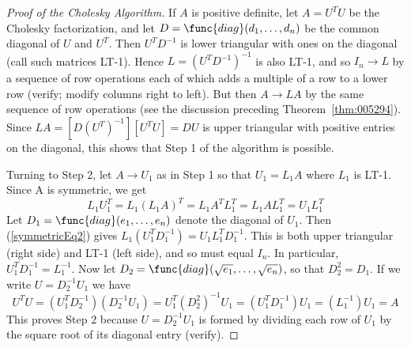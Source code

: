 \begin{proof}[Proof of the Cholesky Algorithm]
If $A$ is positive definite, let $A = U^{T}U$ be the Cholesky factorization, and let $D = \func{diag}(d_{1}, \dots, d_{n})$ be the common diagonal of $U$ and $U^{T}$. Then $U^{T}D^{-1}$ is lower triangular with ones on the diagonal (call such matrices LT-1). Hence $L = (U^{T}D^{-1})^{-1}$ is also LT-1, and so $I_{n} \to L$ by a sequence of row operations each of which adds a multiple of a row 
to a lower row (verify; modify columns right to left). But then $A \to LA$ by the same sequence of row operations (see the discussion preceding Theorem~\ref{thm:005294}). Since $LA = [D(U^{T})^{-1}][U^{T}U] = DU$ is upper triangular with positive entries on the diagonal, this shows that Step 1 of the algorithm is possible.

Turning to Step 2, let $A \to U_{1}$ as in Step 1 so that $U_{1} = L_{1}A$ where $L_{1}$ is
LT-1. Since A is symmetric, we get
\begin{equation} \label{symmetricEq2}
L_{1}U_{1}^T = L_{1}(L_{1}A)^T = L_{1}A^TL_{1}^T = L_{1}AL_{1}^T = U_{1}L_{1}^T
\end{equation}
Let $D_{1} = \func{diag}(e_{1}, \dots, e_{n})$ denote the diagonal of $U_{1}$. Then (\ref{symmetricEq2}) gives $L_{1}(U_{1}^TD_{1}^{-1}) = U_{1}L_{1}^TD_{1}^{-1}$. This is both upper triangular (right side) and LT-1 (left side), and so must equal $I_{n}$. In particular, $U_{1}^TD_{1}^{-1} = L_{1}^{-1}$. Now let $D_{2} = \func{diag}(\sqrt{e_{1}}, \dots, \sqrt{e_{n}})$, so that $D_{2}^2 = D_{1}$. If we write $U = D_{2}^{-1}U_{1}$
 we have
\begin{equation*}
U^TU = (U_{1}^TD_{2}^{-1})(D_{2}^{-1}U_{1}) = U_{1}^T(D_{2}^2)^{-1}U_{1} = (U_{1}^TD_{1}^{-1})U_{1} = (L_{1}^{-1})U_{1} = A
\end{equation*}
This proves Step 2 because $U = D_{2}^{-1}U_{1}$ is formed by dividing each row of $U_{1}$ by the square root of its diagonal entry (verify).
\end{proof}
